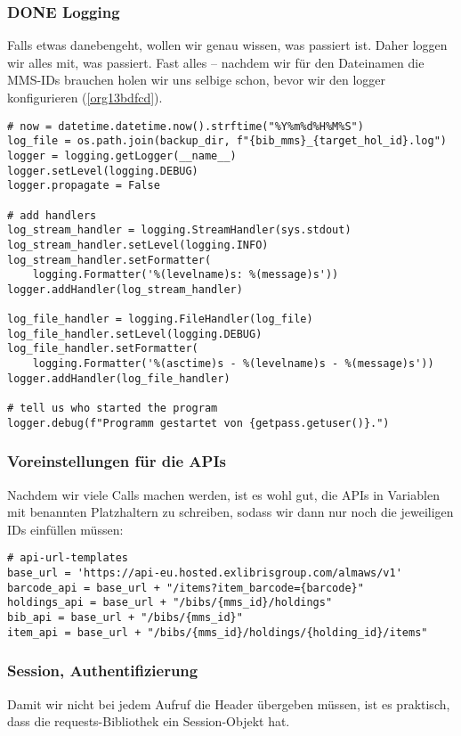 \documentclass[10pt, a4paper]{scrartcl}
\begin{document}
\subsubsection{{\bfseries\sffamily DONE} Logging}
\label{sec:orgaf2d57e}
Falls etwas danebengeht, wollen wir genau wissen, was passiert ist. Daher
loggen wir alles mit, was passiert. Fast alles -- nachdem wir für den
Dateinamen die MMS-IDs brauchen holen wir uns selbige schon, bevor wir den
logger konfigurieren (\ref{org13bdfcd}).

\begin{verbatim}
# now = datetime.datetime.now().strftime("%Y%m%d%H%M%S")
log_file = os.path.join(backup_dir, f"{bib_mms}_{target_hol_id}.log")
logger = logging.getLogger(__name__)
logger.setLevel(logging.DEBUG)
logger.propagate = False

# add handlers
log_stream_handler = logging.StreamHandler(sys.stdout)
log_stream_handler.setLevel(logging.INFO)
log_stream_handler.setFormatter(
    logging.Formatter('%(levelname)s: %(message)s'))
logger.addHandler(log_stream_handler)

log_file_handler = logging.FileHandler(log_file)
log_file_handler.setLevel(logging.DEBUG)
log_file_handler.setFormatter(
    logging.Formatter('%(asctime)s - %(levelname)s - %(message)s'))
logger.addHandler(log_file_handler)

# tell us who started the program
logger.debug(f"Programm gestartet von {getpass.getuser()}.")
\end{verbatim}

\subsubsection{Voreinstellungen für die APIs}
\label{sec:org94cf360}
Nachdem wir viele Calls machen werden, ist es wohl gut, die APIs in
Variablen mit benannten Platzhaltern zu schreiben, sodass wir dann nur
noch die jeweiligen IDs einfüllen müssen:

\begin{verbatim}
# api-url-templates
base_url = 'https://api-eu.hosted.exlibrisgroup.com/almaws/v1'
barcode_api = base_url + "/items?item_barcode={barcode}"
holdings_api = base_url + "/bibs/{mms_id}/holdings"
bib_api = base_url + "/bibs/{mms_id}"
item_api = base_url + "/bibs/{mms_id}/holdings/{holding_id}/items"
\end{verbatim}

\subsubsection{Session, Authentifizierung}
\label{sec:org5749621}
Damit wir nicht bei jedem Aufruf die Header übergeben müssen, ist es
praktisch, dass die requests-Bibliothek ein Session-Objekt hat.
\end{document}
